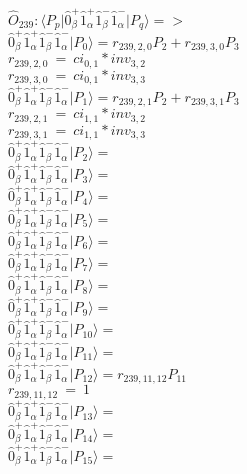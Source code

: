 \documentclass[14pt]{article}
\begin{document}
    $\hat{O}_{239}:  \langle{P_p}\vert \hat{0}_{\beta}^{+}\hat{1}_{\alpha}^{+}\hat{1}_{\beta}^{-}\hat{1}_{\alpha}^{-} \vert{P_q}\rangle => $ \\ 
    $ \hat{0}_{\beta}^{+}\hat{1}_{\alpha}^{+}\hat{1}_{\beta}^{-}\hat{1}_{\alpha}^{-} \vert{P_{0}}\rangle = {r}_{239,2,0}P_{2}+{r}_{239,3,0}P_{3} $ \\ 
    ${r}_{239,2,0}\ =\ {ci}_{0,1}*{inv}_{3,2} $ \\ 
    ${r}_{239,3,0}\ =\ {ci}_{0,1}*{inv}_{3,3} $ \\ 
    $ \hat{0}_{\beta}^{+}\hat{1}_{\alpha}^{+}\hat{1}_{\beta}^{-}\hat{1}_{\alpha}^{-} \vert{P_{1}}\rangle = {r}_{239,2,1}P_{2}+{r}_{239,3,1}P_{3} $ \\ 
    ${r}_{239,2,1}\ =\ {ci}_{1,1}*{inv}_{3,2} $ \\ 
    ${r}_{239,3,1}\ =\ {ci}_{1,1}*{inv}_{3,3} $ \\ 
    $ \hat{0}_{\beta}^{+}\hat{1}_{\alpha}^{+}\hat{1}_{\beta}^{-}\hat{1}_{\alpha}^{-} \vert{P_{2}}\rangle =  $ \\ 
    $ \hat{0}_{\beta}^{+}\hat{1}_{\alpha}^{+}\hat{1}_{\beta}^{-}\hat{1}_{\alpha}^{-} \vert{P_{3}}\rangle =  $ \\ 
    $ \hat{0}_{\beta}^{+}\hat{1}_{\alpha}^{+}\hat{1}_{\beta}^{-}\hat{1}_{\alpha}^{-} \vert{P_{4}}\rangle =  $ \\ 
    $ \hat{0}_{\beta}^{+}\hat{1}_{\alpha}^{+}\hat{1}_{\beta}^{-}\hat{1}_{\alpha}^{-} \vert{P_{5}}\rangle =  $ \\ 
    $ \hat{0}_{\beta}^{+}\hat{1}_{\alpha}^{+}\hat{1}_{\beta}^{-}\hat{1}_{\alpha}^{-} \vert{P_{6}}\rangle =  $ \\ 
    $ \hat{0}_{\beta}^{+}\hat{1}_{\alpha}^{+}\hat{1}_{\beta}^{-}\hat{1}_{\alpha}^{-} \vert{P_{7}}\rangle =  $ \\ 
    $ \hat{0}_{\beta}^{+}\hat{1}_{\alpha}^{+}\hat{1}_{\beta}^{-}\hat{1}_{\alpha}^{-} \vert{P_{8}}\rangle =  $ \\ 
    $ \hat{0}_{\beta}^{+}\hat{1}_{\alpha}^{+}\hat{1}_{\beta}^{-}\hat{1}_{\alpha}^{-} \vert{P_{9}}\rangle =  $ \\ 
    $ \hat{0}_{\beta}^{+}\hat{1}_{\alpha}^{+}\hat{1}_{\beta}^{-}\hat{1}_{\alpha}^{-} \vert{P_{10}}\rangle =  $ \\ 
    $ \hat{0}_{\beta}^{+}\hat{1}_{\alpha}^{+}\hat{1}_{\beta}^{-}\hat{1}_{\alpha}^{-} \vert{P_{11}}\rangle =  $ \\ 
    $ \hat{0}_{\beta}^{+}\hat{1}_{\alpha}^{+}\hat{1}_{\beta}^{-}\hat{1}_{\alpha}^{-} \vert{P_{12}}\rangle = {r}_{239,11,12}P_{11} $ \\ 
    ${r}_{239,11,12}\ =\ 1 $ \\ 
    $ \hat{0}_{\beta}^{+}\hat{1}_{\alpha}^{+}\hat{1}_{\beta}^{-}\hat{1}_{\alpha}^{-} \vert{P_{13}}\rangle =  $ \\ 
    $ \hat{0}_{\beta}^{+}\hat{1}_{\alpha}^{+}\hat{1}_{\beta}^{-}\hat{1}_{\alpha}^{-} \vert{P_{14}}\rangle =  $ \\ 
    $ \hat{0}_{\beta}^{+}\hat{1}_{\alpha}^{+}\hat{1}_{\beta}^{-}\hat{1}_{\alpha}^{-} \vert{P_{15}}\rangle =  $ \\ 
    
\end{document}
